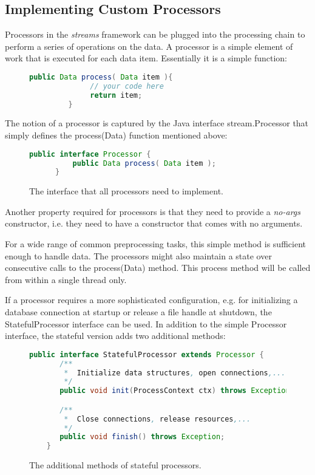 
\subsection{\label{sec:customProcessors}Implementing Custom Processors}
Processors in the {\em streams} framework can be plugged into the
processing chain to perform a series of operations on the data.  A
processor is a simple element of work that is executed for each data
item. Essentially it is a simple function:

\begin{figure}[h!]
   \centering 
   \begin{lstlisting}[language=Java]
         public Data process( Data item ){
              // your code here
              return item;
         }
   \end{lstlisting}
\end{figure}

The notion of a processor is captured by the Java interface {\ttfamily
stream.Processor} that simply defines the {\ttfamily process(Data)}
function mentioned above:

\begin{figure}[h!]
  \centering
  \begin{lstlisting}[language=Java]
      public interface Processor {
          public Data process( Data item );
      }
  \end{lstlisting}
  \caption{\label{fig:processorInterface}The interface that all processors need to implement.}
\end{figure}

Another property required for processors is that they need to provide
a {\em no-args} constructor, i.e. they need to have a constructor that
comes with no arguments.

For a wide range of common preprocessing tasks, this simple method is
sufficient enough to handle data. The processors might also maintain a
state over consecutive calls to the {\ttfamily process(Data)} method.
This {\ttfamily process} method will be called from within a single
thread only.

If a processor requires a more sophisticated configuration, e.g. for
initializing a database connection at startup or release a file handle
at shutdown, the {\ttfamily StatefulProcessor} interface can be used.
In addition to the simple {\ttfamily Processor} interface, the stateful
version adds two additional methods:
\begin{figure}[h!]
  \centering
  \begin{lstlisting}[language=Java]
    public interface StatefulProcessor extends Processor {
       /**
        *  Initialize data structures, open connections,...
        */
       public void init(ProcessContext ctx) throws Exception;

       /**
        *  Close connections, release resources,...
        */
       public void finish() throws Exception;
    }
  \end{lstlisting}
  \caption{\label{fig:statefulProcessor} The additional methods of stateful processors.}
\end{figure}

